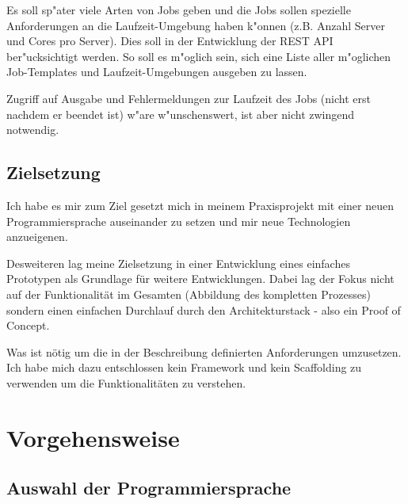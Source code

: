 \documentclass[12pt]{article}
\begin{document}
Es soll sp"ater viele Arten von Jobs geben und die Jobs sollen spezielle Anforderungen an die Laufzeit-Umgebung haben k"onnen (z.B. Anzahl Server und Cores pro Server). Dies soll in der Entwicklung der REST API ber"ucksichtigt werden. So soll es m"oglich sein, sich eine Liste aller m"oglichen Job-Templates und Laufzeit-Umgebungen ausgeben zu lassen.

Zugriff auf Ausgabe und Fehlermeldungen zur Laufzeit des Jobs (nicht erst nachdem er beendet ist) w"are w"unschenswert, ist aber nicht zwingend notwendig.



\subsection{Zielsetzung}

Ich habe es mir zum Ziel gesetzt mich in meinem Praxisprojekt mit einer neuen Programmiersprache auseinander zu setzen und mir neue Technologien anzueigenen.


Desweiteren lag meine Zielsetzung in einer Entwicklung eines einfaches Prototypen als Grundlage für weitere Entwicklungen. Dabei lag der Fokus nicht auf der Funktionalität im Gesamten (Abbildung des kompletten Prozesses) sondern einen einfachen Durchlauf durch den Architekturstack - also ein Proof of Concept.

Was ist nötig um die in der Beschreibung definierten Anforderungen umzusetzen. Ich habe mich dazu entschlossen kein Framework und kein Scaffolding zu verwenden um die Funktionalitäten zu verstehen.



\newpage

\section{Vorgehensweise}
\subsection{Auswahl der Programmiersprache}
\end{document}
